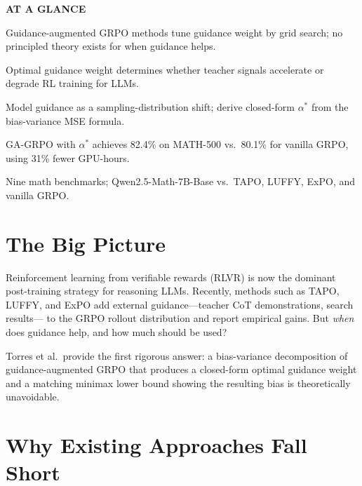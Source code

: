 \documentclass[10pt,twocolumn]{article}
\begin{document}
\begin{mdframed}[backgroundcolor=boxgray,linecolor=rulered,linewidth=1pt,
    innerleftmargin=6pt,innerrightmargin=6pt,
    innertopmargin=6pt,innerbottommargin=6pt]
\textbf{\small AT A GLANCE}\par\vspace{4pt}
\begin{description}[leftmargin=0pt,labelsep=4pt,itemsep=2pt,parsep=0pt,
    font=\small\bfseries]
  \item[Problem:] Guidance-augmented GRPO methods tune guidance weight
    by grid search; no principled theory exists for when guidance helps.
  \item[Why it matters:] Optimal guidance weight determines whether teacher
    signals accelerate or degrade RL training for LLMs.
  \item[Method:] Model guidance as a sampling-distribution shift; derive
    closed-form $\alpha^*$ from the bias-variance MSE formula.
  \item[Result:] GA-GRPO with $\alpha^*$ achieves 82.4\% on MATH-500 vs.\
    80.1\% for vanilla GRPO, using 31\% fewer GPU-hours.
  \item[Evidence:] Nine math benchmarks; Qwen2.5-Math-7B-Base vs.\ TAPO,
    LUFFY, ExPO, and vanilla GRPO.
\end{description}
\end{mdframed}

\section{The Big Picture}

Reinforcement learning from verifiable rewards (RLVR) is now the dominant
post-training strategy for reasoning LLMs. Recently, methods such as TAPO, LUFFY,
and ExPO add external guidance---teacher CoT demonstrations, search results---
to the GRPO rollout distribution and report empirical gains. But \emph{when}
does guidance help, and how much should be used?

Torres et al.\ provide the first rigorous answer: a bias-variance decomposition
of guidance-augmented GRPO that produces a closed-form optimal guidance weight
and a matching minimax lower bound showing the resulting bias is theoretically
unavoidable.

\section{Why Existing Approaches Fall Short}
\end{document}
